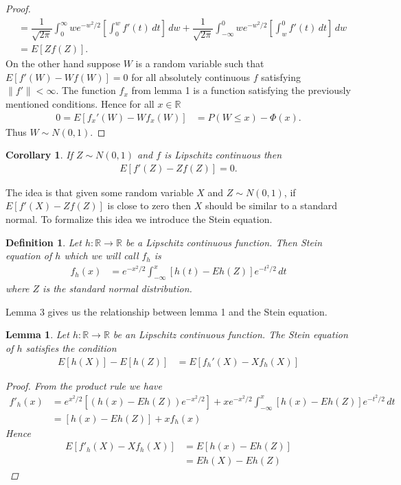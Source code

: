 \documentclass[11pt]{article}
\newtheorem{lemma}{Lemma}
\newtheorem*{defin}{Definition}
\newtheorem*{cor}{Corollary}
\begin{document}
\begin{flushleft}
\begin{proof}
\begin{align*}
&= \dfrac{1}{\sqrt{2\pi}} \int_{0}^{\infty} we^{-w^2/2} \left[ \int_{0}^{w} f'(t) \, dt \right] \, dw
+ \dfrac{1}{\sqrt{2\pi}} \int_{-\infty}^{0} we^{-w^2/2} \left[ \int_{w}^{0} f'(t) \, dt \right] \, dw\\
&= E[Zf(Z)].
\end{align*}
On the other hand suppose $W$ is a random variable such that 
$E[f'(W) - Wf(W)] = 0$ for all absolutely continuous $f$ satisfying $\|f'\| < \infty$.
The function $f_x$ from lemma 1 is a function satisfying the previously mentioned conditions.
Hence for all $x \in \mathbb{R}$
\begin{align*}
0 = E[f_x'(W) - Wf_x(W)] &= P(W \leq x) - \Phi(x).
\end{align*}
Thus $W \sim N(0,1)$.
\end{proof}




\begin{cor}
If $Z \sim N(0,1)$ and $f$ is Lipschitz continuous then 
\begin{align*}
E[f'(Z) - Zf(Z)] = 0.
\end{align*}
\end{cor}


The idea is that given some random variable $X$ and $Z \sim N(0,1)$, if $E[f'(X) - Zf(Z)]$ is close to zero then $X$ should be similar to a standard normal.
To formalize this idea we introduce the Stein equation.

\begin{defin}
Let $h: \mathbb{R} \to \mathbb{R}$ be a Lipschitz continuous function. Then Stein equation of $h$ which we will call $f_h$ is 
\begin{align*}
f_h(x) &= e^{-x^2/2} \int_{-\infty}^{x} [h(t) - Eh(Z)] e^{-t^2/2} \, dt
\end{align*}
where $Z$ is the standard normal distribution.
\end{defin}

Lemma 3 gives us the relationship between lemma 1 and the Stein equation.

\begin{lemma}
Let $h: \mathbb{R} \to \mathbb{R}$ be an Lipschitz continuous function. The Stein equation of $h$ satisfies the condition
\begin{align*}
E[h(X)] - E[h(Z)] &= E[f_h'(X) - Xf_h(X)]
\end{align*}
\begin{proof}
From the product rule we have
\begin{align*}
f'_h(x) &= e^{x^2/2}\left[ (h(x) - Eh(Z)) e^{-x^2/2} \right] + xe^{-x^2/2} \int_{-\infty}^{x} [h(x) - Eh(Z)] e ^{-t^2/2} \, dt \\
&= [h(x) - Eh(Z)] + xf_h(x)
\end{align*}
Hence
\begin{align*}
E[f'_h(X) - Xf_h(X)] &= E[h(x) - Eh(Z)]\\
&= Eh(X) - Eh(Z)
\end{align*}
\end{proof}
\end{lemma}


\end{flushleft}
\end{document}
